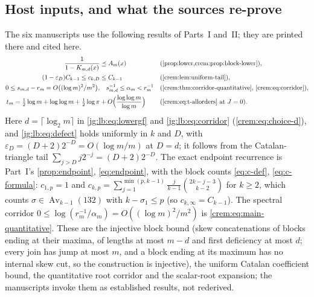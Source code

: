\documentclass[11pt,a4paper]{article}
\theoremstyle{definition}\newaliascnt{definition}{theorem}
\theoremstyle{remark}\newaliascnt{remark}{theorem}
\newcommand{\Av}{\operatorname{Av}}
\newcommand{\preceqc}{\preceq}
\newcommand{\eps}{\varepsilon}
\begin{document}
\subsection{Host inputs, and what the sources re-prove}
\label{jg:sec:inputs}
The six manuscripts use the following results of Parts~I and~II; they are
printed there and cited here.
\begin{align}
 \frac1{1-K_{m,d}(x)}&\preceqc A_m(x)
   &&\text{(\cref{prop:lower,crem:prop:block-lower})},\label{jg:lb:eq:lowergf}\\
 (1-\eps_D)C_{k-1}\le c_{k,D}&\le C_{k-1}
   &&\text{(\cref{crem:lem:uniform-tail})},\label{jg:lb:eq:defect}\\
 0\le s_{m,d}-r_m=O\bigl((\log m)^2/m^2\bigr),&\quad
   s_{m,d}^{-1}\le\alpha_m<r_m^{-1}
   &&\text{(\cref{crem:thm:corridor-quantitative}, \eqref{crem:eq:corridor})},\label{jg:lb:eq:corridor}\\
 t_m=\tfrac12\log m+\log\log m+\tfrac12\log\pi
   &+O\Bigl(\frac{\log\log m}{\log m}\Bigr)
   &&\text{(\eqref{crem:eq:t-allorders} at $J=0$)}.\label{jg:lb:eq:scalar}
\end{align}
Here $d=\lceil\log_2m\rceil$ in \eqref{jg:lb:eq:lowergf} and
\eqref{jg:lb:eq:corridor} (\eqref{crem:eq:choice-d}), and
\eqref{jg:lb:eq:defect} holds uniformly in $k$ and $D$, with
$\eps_D=(D+2)2^{-D}=O(\log m/m)$ at $D=d$; it follows from the
Catalan-triangle tail $\sum_{j>D}j2^{-j}=(D+2)2^{-D}$. The exact endpoint
recurrence is Part~I's \cref{prop:endpoint}, \eqref{eq:endpoint}, with the block
counts \eqref{eq:c-def}, \eqref{eq:c-formula}: $c_{1,p}=1$ and
$c_{k,p}=\sum_{j=1}^{\min(p,k-1)}\frac{j}{k-1}\binom{2k-j-3}{k-2}$ for $k\ge2$,
which counts $\sigma\in\Av_{k-1}(132)$ with $k-\sigma_1\le p$ (so
$c_{k,\infty}=C_{k-1}$). The spectral corridor
$0\le\log(r_m^{-1}/\alpha_m)=O((\log m)^2/m^2)$ is
\eqref{crem:eq:main-quantitative}. These are the injective block bound (skew
concatenations of blocks ending at their maxima, of lengths at most $m-d$ and
first deficiency at most $d$; every join has jump at most $m$, and a block
ending at its maximum has no internal skew cut, so the construction is
injective), the uniform Catalan coefficient bound, the quantitative root
corridor and the scalar-root expansion; the manuscripts invoke them as
established results, not rederived.
\end{document}
